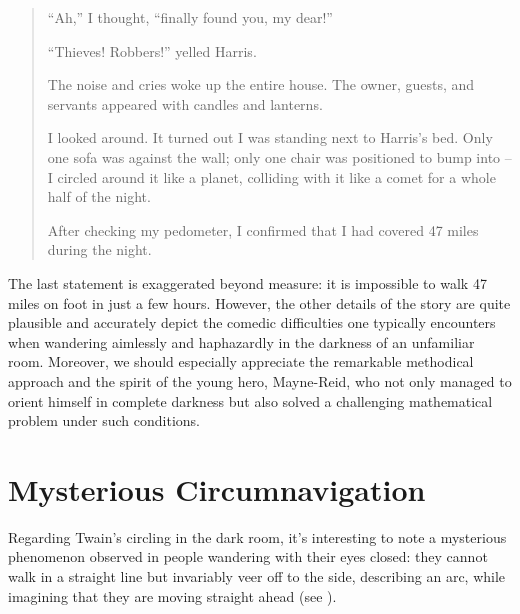 \begin{quote}
``Ah,'' I thought, ``finally found you, my dear!''

``Thieves! Robbers!'' yelled Harris.

The noise and cries woke up the entire house. The owner, guests, and servants appeared with candles and lanterns.

I looked around. It turned out I was standing next to Harris's bed. Only one sofa was against the wall; only one chair was positioned to bump into -- I circled around it like a planet, colliding with it like a comet for a whole half of the night.

After checking my pedometer, I confirmed that I had covered 47 miles during the night.
\end{quote}

The last statement is exaggerated beyond measure: it is impossible to walk 47 miles on foot in just a few hours. However, the other details of the story are quite plausible and accurately depict the comedic difficulties one typically encounters when wandering aimlessly and haphazardly in the darkness of an unfamiliar room. Moreover, we should especially appreciate the remarkable methodical approach and the spirit of the young hero, Mayne-Reid, who not only managed to orient himself in complete darkness but also solved a challenging mathematical problem under such conditions.


\section{Mysterious Circumnavigation}
\label{sec-8.7}


Regarding Twain's circling in the dark room, it's interesting to note a mysterious phenomenon observed in people wandering with their eyes closed: they cannot walk in a straight line but invariably veer off to the side, describing an arc, while imagining that they are moving straight ahead (see ).


